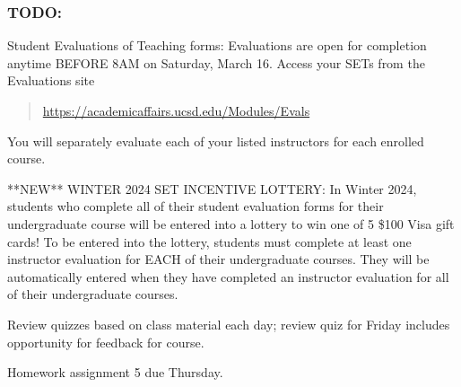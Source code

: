 \subsubsection*{TODO:}
\begin{list}
   {\itemsep2pt}
   \item Student Evaluations of Teaching forms: Evaluations are open for completion anytime BEFORE 8AM on Saturday, March 16.
    Access your SETs from the Evaluations site
    \begin{quote}
         \url{https://academicaffairs.ucsd.edu/Modules/Evals}
    \end{quote}
    You will separately evaluate each of your listed instructors for each enrolled course. 

    **NEW** WINTER 2024 SET INCENTIVE LOTTERY: In Winter 2024, students who complete all of their student 
    evaluation forms for their undergraduate course will be entered into a lottery to win one of 
    5 \$100 Visa gift cards! To be entered into the lottery, students must complete at 
    least one instructor evaluation for EACH of their undergraduate courses. 
    They will be automatically entered when they have completed an instructor evaluation for 
    all of their undergraduate courses.

   \item Review quizzes based on class material each day; review quiz for Friday includes opportunity for feedback for course.
   \item Homework assignment 5 due Thursday.
\end{list}



